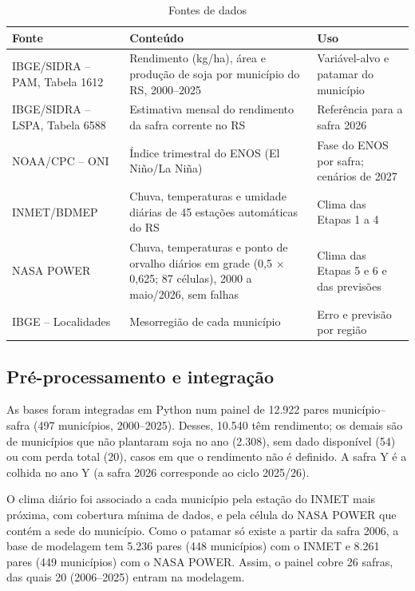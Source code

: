 \documentclass[
	article,			%
	11pt,				%
	oneside,			%
	a4paper,			%
	english,			%
	brazil,				%
	sumario=tradicional
	]{abntex2}
\begin{document}
\begin{table}[htbp]
\centering
\caption{Fontes de dados}
\label{tab:fontes}
\small
\begin{tabular}{|>{\raggedright\arraybackslash}p{3.19cm}|>{\raggedright\arraybackslash}p{6.01cm}|>{\raggedright\arraybackslash}p{4.13cm}|}
\hline
\textbf{Fonte} & \textbf{Conteúdo} & \textbf{Uso} \\ \hline
IBGE/SIDRA -- PAM, Tabela 1612 \cite{ibge} & Rendimento (kg/ha), área e produção de soja por município do RS, 2000--2025 & Variável-alvo e patamar do município \\ \hline
IBGE/SIDRA -- LSPA, Tabela 6588 \cite{ibgelspa} & Estimativa mensal do rendimento da safra corrente no RS & Referência para a safra 2026 \\ \hline
NOAA/CPC -- ONI \cite{noaa} & Índice trimestral do ENOS (El Niño/La Niña) & Fase do ENOS por safra; cenários de 2027 \\ \hline
INMET/BDMEP \cite{inmet} & Chuva, temperaturas e umidade diárias de 45 estações automáticas do RS & Clima das Etapas 1 a 4 \\ \hline
NASA POWER \cite{nasapower} & Chuva, temperaturas e ponto de orvalho diários em grade (0,5\textdegree{} $\times$ 0,625\textdegree{}; 87 células), 2000 a maio/2026, sem falhas & Clima das Etapas 5 e 6 e das previsões \\ \hline
IBGE -- Localidades \cite{ibgelocalidades} & Mesorregião de cada município & Erro e previsão por região \\ \hline
\end{tabular}
\end{table}

\subsection{Pré-processamento e integração}

As bases foram integradas em Python num painel de 12.922 pares município--safra (497 municípios, 2000--2025). Desses, 10.540 têm rendimento; os demais são de municípios que não plantaram soja no ano (2.308), sem dado disponível (54) ou com perda total (20), casos em que o rendimento não é definido. A safra Y é a colhida no ano Y (a safra 2026 corresponde ao ciclo 2025/26).

O clima diário foi associado a cada município pela estação do INMET mais próxima, com cobertura mínima de dados, e pela célula do NASA POWER que contém a sede do município. Como o patamar só existe a partir da safra 2006, a base de modelagem tem 5.236 pares (448 municípios) com o INMET e 8.261 pares (449 municípios) com o NASA POWER. Assim, o painel cobre 26 safras, das quais 20 (2006–2025) entram na modelagem.
\end{document}
